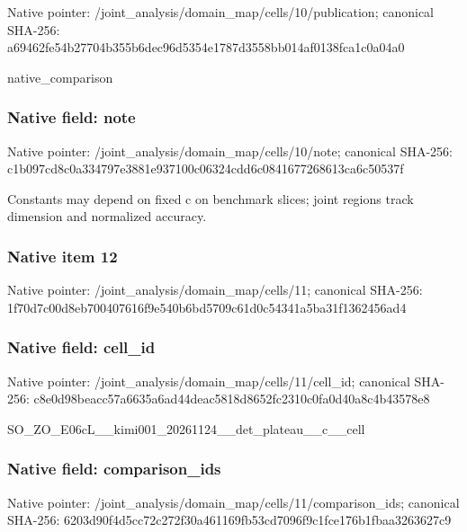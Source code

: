 \documentclass[10pt,a4paper]{article}
\begin{document}
Native pointer: /joint\_analysis/domain\_m\allowbreak{}ap/cells/10/publication; canonical SHA-256: a69462fe54b27704b355b6de\allowbreak{}c96d5354e1787d3558bb014a\allowbreak{}f0138fca1c0a04a0


native\_comparison


\subsubsection{Native field: note}


Native pointer: /joint\_analysis/domain\_m\allowbreak{}ap/cells/10/note; canonical SHA-256: c1b097cd8c0a334797e3881e\allowbreak{}937100c06324cdd6c0841677\allowbreak{}268613ca6c50537f


Constants may depend on fixed c on benchmark slices; joint regions track dimension and normalized accuracy.


\subsubsection{Native item 12}


Native pointer: /joint\_analysis/domain\_map/cells/11; canonical SHA-256: 1f70d7c00d8eb700407616f9\allowbreak{}e540b6bd5709c61d0c54341a\allowbreak{}5ba31f1362456ad4



\subsubsection{Native field: cell\_id}


Native pointer: /joint\_analysis/domain\_m\allowbreak{}ap/cells/11/cell\_id; canonical SHA-256: c8e0d98beacc57a6635a6ad4\allowbreak{}4deac5818d8652fc2310c0fa\allowbreak{}0d40a8c4b43578e8


SO\_ZO\_E06cL\_\_kimi001\_202\allowbreak{}61124\_\_det\_plateau\_\_c\_\_c\allowbreak{}ell


\subsubsection{Native field: comparison\_ids}


Native pointer: /joint\_analysis/domain\_m\allowbreak{}ap/cells/11/comparison\_i\allowbreak{}ds; canonical SHA-256: 6203d90f4d5cc72c272f30a4\allowbreak{}61169fb53cd7096f9c1fce17\allowbreak{}6b1fbaa3263627c9
\end{document}
